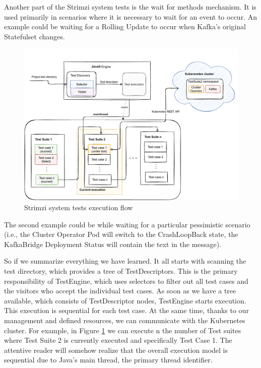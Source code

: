 Another part of the Strimzi system tests is the wait for methods mechanism. It is used primarily in scenarios where it is necessary to wait for an event to occur. An example could be waiting for a Rolling Update to occur when Kafka's original Statefulset changes. \begin{figure}[!ht]
    \centering
    \includegraphics[scale=0.70]{obrazky-figures/02-preliminaries/04-strimzi-system-tests/02d-strimzisystemtest-sequence-execution.pdf}
    \caption{Strimzi system tests execution flow}
    \label{02d:fig:strimzisysmtetest:execution}
\end{figure}
The second example could be while waiting for a particular pessimistic scenario (i.e., the Cluster Operator Pod will switch to the CrashLoopBack state, the KafkaBridge Deployment Status will contain the text in the message).

So if we summarize everything we have learned. It all starts with scanning the test directory, which provides a tree of TestDescriptors. This is the primary responsibility of TestEngine, which uses selectors to filter out all test cases and the visitors who accept the individual test cases. As soon as we have a tree available, which consists of TestDescriptor nodes, TestEngine starts execution. This execution is sequential for each test case. At the same time, thanks to our management and defined resources, we can communicate with the Kubernetes cluster. For example, in Figure \ref{02d:fig:strimzisysmtetest:execution} we can execute n the number of Test suites where Test Suite 2 is currently executed and specifically Test Case 1. The attentive reader will somehow realize that the overall execution model is sequential due to Java's main thread, the primary thread identifier.